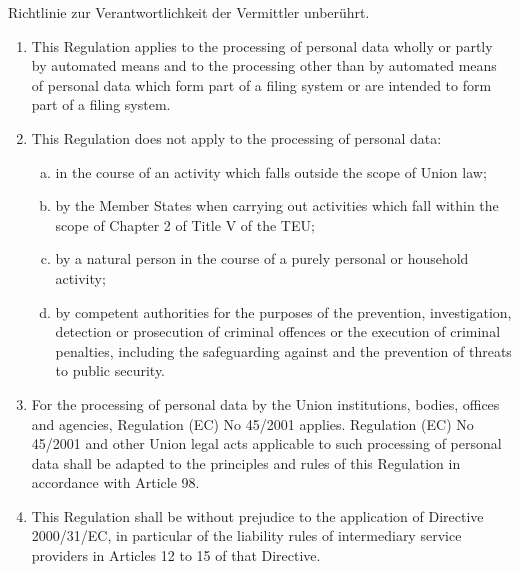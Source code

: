 \documentclass[%
  a4paper,
  10pt,
  version=last
]{scrartcl}
\begin{document}
\begin{legal}[0.5]
{\begin{enumerate}[(1)]
          Richtlinie zur Verantwortlichkeit der Vermittler unberührt.
      \end{enumerate}
    }{
      \begin{enumerate}[(1)]
        \item This Regulation applies to the processing of personal data wholly
          or partly by automated means and to the processing other than by
          automated means of personal data which form part of a filing system or
          are intended to form part of a filing system.
        \item This Regulation does not apply to the processing of personal data:
          \begin{enumerate}[a)]
            \item in the course of an activity which falls outside the scope of Union law;
            \item by the Member States when carrying out activities which fall
              within the scope of Chapter 2 of Title V of the TEU;
            \item by a natural person in the course of a purely personal or
              household activity;
            \item by competent authorities for the purposes of the prevention,
              investigation, detection or prosecution of criminal offences or the
              execution of criminal penalties, including the safeguarding against
              and the prevention of threats to public security.
          \end{enumerate}
        \item For the processing of personal data by the Union institutions,
          bodies, offices and agencies, Regulation (EC) No 45/2001 applies.
          Regulation (EC) No 45/2001 and other Union legal acts applicable to
          such processing of personal data shall be adapted to the principles and
          rules of this Regulation in accordance with Article 98.
        \item This Regulation shall be without prejudice to the application of
          Directive 2000/31/EC, in particular of the liability rules of
          intermediary service providers in Articles 12 to 15 of that Directive.
      \end{enumerate}
    }
  \end{legal}
\end{document}
